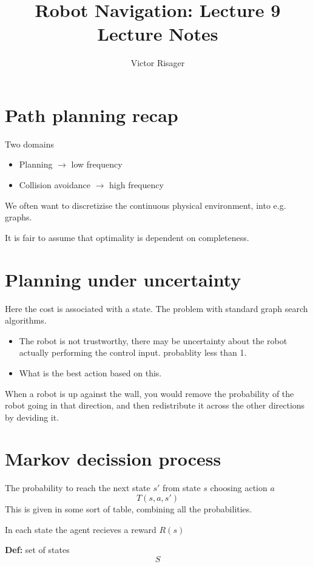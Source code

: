 \documentclass[a4paper]{article}
\title{Robot Navigation: Lecture 9 \\
	\large Lecture Notes}
\author{Victor Risager}
\begin{document}
\maketitle
\section{Path planning recap}
Two domains 
\begin{itemize}
	\item Planning $ \rightarrow  $ low frequency
	\item Collision avoidance $ \rightarrow $ high frequency
\end{itemize}

We often want to discretizise the continuous physical environment, into e.g. graphs. 

It is fair to assume that optimality is dependent on completeness. 

\section{Planning under uncertainty}
Here the cost is associated with a state.
The problem with standard graph search algorithms.
\begin{itemize}
	\item The robot is not trustworthy, there may be uncertainty about the robot actually performing the control input. probablity less than 1.
	\item What is the best action based on this.
\end{itemize}

When a robot is up against the wall, you would remove the probability of the robot going in that direction, and then redistribute it across the other directions by deviding it.


\section{Markov decission process}

The probability to reach the next state $ s' $ from state $ s $ choosing action $ a $
\begin{equation}
T(s,a,s')
\end{equation}
This is given in some sort of table, combining all the probabilities. 

In each state the agent recieves a reward $ R(s) $

 \textbf{Def:} 
 set of states
 \begin{equation}
 S
 \end{equation}
 
\end{document}
